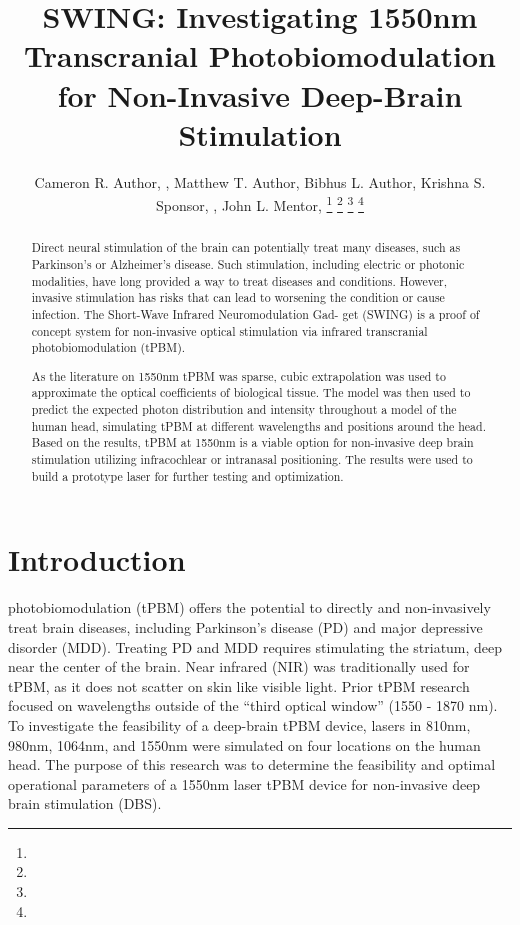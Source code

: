 \documentclass[journal,twoside,web]{ieeecolor}
\begin{document}
\title{SWING: Investigating 1550nm Transcranial Photobiomodulation for Non-Invasive Deep-Brain Stimulation}
\author{Cameron R. Author, , Matthew T. Author, Bibhus L. Author, 
        Krishna S. Sponsor, , John L. Mentor, 
\thanks{ }
\thanks{ }
\thanks{ }
\thanks{ }}

\maketitle

\begin{abstract}
Direct neural stimulation of the brain can potentially treat many diseases, such as Parkinson’s or Alzheimer’s disease. Such stimulation, including electric or photonic modalities, have long provided a way to treat diseases and conditions. However, invasive stimulation has risks that can lead to worsening the condition or cause infection. The Short-Wave Infrared Neuromodulation Gad- get (SWING) is a proof of concept system for non-invasive optical stimulation via infrared transcranial photobiomodulation (tPBM).

As the literature on 1550nm tPBM was sparse, cubic extrapolation was used to approximate the optical coefficients of biological tissue. The model was then used to predict the expected photon distribution and intensity throughout a model of the human head, simulating tPBM at different wavelengths and positions around the head. Based on the results, tPBM at 1550nm is a viable option for non-invasive deep brain stimulation utilizing infracochlear or intranasal positioning. The results were used to build a prototype laser for further testing and optimization.
\end{abstract}

\begin{IEEEkeywords}

\end{IEEEkeywords}

\section{Introduction}
\label{sec:introduction}
 photobiomodulation (tPBM) offers the potential to directly and non-invasively treat brain diseases, 
including Parkinson's disease (PD) and major depressive disorder (MDD). Treating PD and MDD requires stimulating the striatum, deep 
near the center of the brain. Near infrared (NIR) was traditionally used for tPBM, as it does not scatter on skin like visible light. 
Prior tPBM research focused on wavelengths outside of the “third optical window” (1550 - 1870 nm). To investigate the feasibility of a deep-brain 
tPBM device, lasers in 810nm, 980nm, 1064nm, and 1550nm were simulated on four locations on the human head. The purpose of this research was to 
determine the feasibility and optimal operational parameters of a 1550nm laser tPBM device for non-invasive deep brain stimulation (DBS). 
\end{document}
